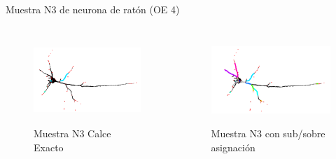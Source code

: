 \begin{frame}{Muestra N3 de neurona de rat\'on (OE 4)}
    \vspace{-1cm}
        \begin{columns}
        \begin{column}{0.45\textwidth}
            \begin{figure}
                \centering
                \includegraphics[height=1.3in]{Pictures/Porta18-3a1-phil-s10-v056-exactMatch-antLabeled.png}
                \caption{Muestra N3 Calce Exacto}
            \end{figure}
        \end{column}
        \begin{column}{0.45\textwidth}
            \begin{figure}
                \centering
                \includegraphics[height=1.3in]{Pictures/Porta18-3a1-phil-s10-v056-overmatches-3-antLabeled.png}
                \caption{Muestra N3 con sub/sobre asignaci\'on}
            \end{figure}
        \end{column}
    \end{columns}
    
    \begin{table}[h]
        \caption{(*) indica el mejor resultado de las 5 iteraciones}
    \end{table}
\end{frame}

